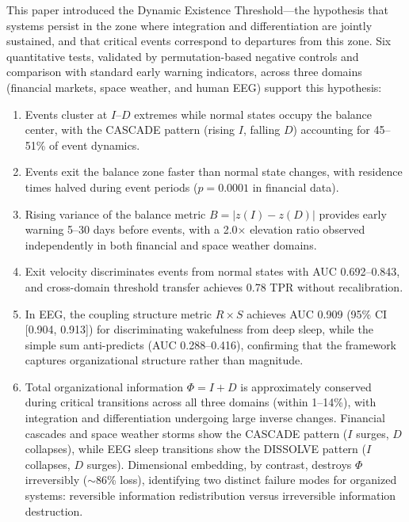 \documentclass[12pt,a4paper]{article}
\begin{document}
This paper introduced the Dynamic Existence Threshold---the hypothesis that systems persist in the zone where integration and differentiation are jointly sustained, and that critical events correspond to departures from this zone. Six quantitative tests, validated by permutation-based negative controls and comparison with standard early warning indicators, across three domains (financial markets, space weather, and human EEG) support this hypothesis:

\begin{enumerate}
\item Events cluster at $I$--$D$ extremes while normal states occupy the balance center, with the CASCADE pattern (rising $I$, falling $D$) accounting for 45--51\% of event dynamics.
\item Events exit the balance zone faster than normal state changes, with residence times halved during event periods ($p = 0.0001$ in financial data).
\item Rising variance of the balance metric $B = |z(I) - z(D)|$ provides early warning 5--30 days before events, with a 2.0$\times$ elevation ratio observed independently in both financial and space weather domains.
\item Exit velocity discriminates events from normal states with AUC 0.692--0.843, and cross-domain threshold transfer achieves 0.78 TPR without recalibration.
\item In EEG, the coupling structure metric $R \times S$ achieves AUC 0.909 (95\% CI [0.904, 0.913]) for discriminating wakefulness from deep sleep, while the simple sum anti-predicts (AUC 0.288--0.416), confirming that the framework captures organizational structure rather than magnitude.
\item Total organizational information $\Phi = I + D$ is approximately conserved during critical transitions across all three domains (within 1--14\%), with integration and differentiation undergoing large inverse changes. Financial cascades and space weather storms show the CASCADE pattern ($I$ surges, $D$ collapses), while EEG sleep transitions show the DISSOLVE pattern ($I$ collapses, $D$ surges). Dimensional embedding, by contrast, destroys $\Phi$ irreversibly (${\sim}86$\% loss), identifying two distinct failure modes for organized systems: reversible information redistribution versus irreversible information destruction.
\end{enumerate}
\end{document}
